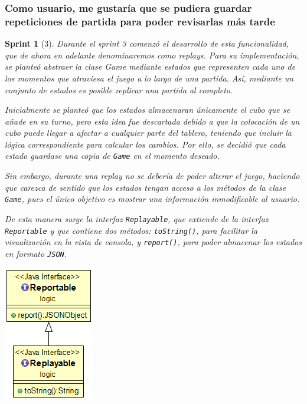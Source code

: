 \documentclass[12pt,a4paper,openright]{book}
\theoremstyle{break}
\newtheorem*{sprint}{Sprint}
\begin{document}
\subsubsection{Como usuario, me gustaría que se pudiera guardar repeticiones de partida para poder revisarlas más tarde}
\begin{sprint}[3]
Durante el sprint 3 comenzó el desarrollo de esta funcionalidad, que de ahora en adelante denominaremos como \textit{replays}. Para su implementación, se planteó abstraer la clase Game mediante estados que representen cada uno de los momentos que atraviesa el juego a lo largo de una partida. Así, mediante un conjunto de estados es posible replicar una partida al completo.

Inicialmente se planteó que los estados almacenaran únicamente el cubo que se añade en su turno, pero esta idea fue descartada debido a que la colocación de un cubo puede llegar a afectar a cualquier parte del tablero, teniendo que incluir la lógica correspondiente para calcular los cambios. Por ello, se decidió que cada estado guardase una copia de \texttt{Game} en el momento deseado.

Sin embargo, durante una \textit{replay} no se debería de poder alterar el juego, haciendo que carezca de sentido que los estados tengan acceso a  los métodos de la clase \texttt{Game}, pues el único objetivo es mostrar una información inmodificable al usuario.

De esta manera surge la interfaz \texttt{Replayable}, que extiende de la interfaz \texttt{Reportable} y que contiene dos métodos: \texttt{toString()}, para facilitar la visualización en la vista de consola, y \texttt{report()}, para poder almacenar los estados en formato \texttt{JSON}.

\begin{center}
\includegraphics[scale=0.5]{replayable-reportable-sprint-3.png}
\end{center}


\end{sprint}
\end{document}

